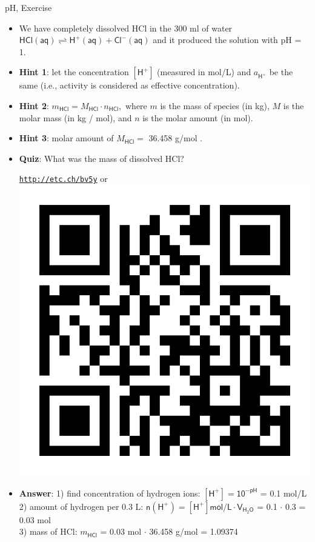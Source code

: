 \begin{frame}{pH, Exercise}
	\small
	\begin{itemize}
		\item We have completely dissolved HCl in the 300 ml of water  
		$\mathsf{HCl(aq) \rightleftharpoons H^+(aq) + Cl^-(aq)}$
		 and it produced the solution with pH = 1. 
		\pause
		\item {\bf Hint 1}: let the concentration $[\mathsf{H^+}]$ (measured in mol/L) and $a_{\mathsf{H^+}}$ be the same (i.e., activity is considered as effective concentration). 
		\item {\bf Hint 2}: $m_{\mathsf{HCl}} = M_{\mathsf{HCl}}  \cdot n_{\mathsf{HCl}},$ 
		where $m$ is the mass of species (in kg), 
		$M$ is the molar mass (in kg / mol), and 
		$n$ is the molar amount (in mol). 
		\item {\bf Hint 3}: molar amount of $M_{\mathsf{HCl}} = $ 36.458 g/mol .
		\pause
		\item  \alert{\bf Quiz}: What was the mass of dissolved HCl?
		\begin{center}
			\href{http://etc.ch/bv5y}{\textcolor{indigo(dye)}{\tt http://etc.ch/bv5y}} 
			\quad
			or 
			\quad
			\includegraphics[height=0.13\columnwidth]{figures/chemical-equilibrium/poll.png}
		\end{center}
 		\hiddenpause
 		\item {\bf Answer}: 
        1) find concentration of hydrogen ions: 
        $\mathsf{[H^+] = 10^{-pH}}$ = 0.1 mol/L \\
        2) amount of hydrogen per 0.3 L: 
        $\mathsf{n(H^+) = [H^+] mol/L \cdot V_{H_2O}}$ 
        = 0.1 $\cdot$ 0.3 = 0.03 mol \\
        3) mass of HCl: 
        $m_{\mathsf{HCl}}$ = 0.03 mol $\cdot$ 36.458 g/mol = 1.09374 
	\end{itemize}
\end{frame}
%
